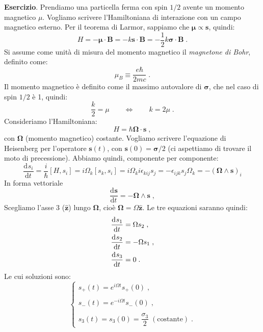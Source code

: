 \documentclass[12pt,a4paper]{report}
\theoremstyle{definition}
\newcommand{\dev}[3][]{\frac{\mathrm{d}^{#1} #2}{\mathrm{d} #3^{#1}}}
\numberwithin{equation}{section}
\begin{document}
\textbf{Esercizio}. Prendiamo una particella ferma con spin $1/2$ avente un momento magnetico $\mu$. Vogliamo scrivere l'Hamiltoniana di interazione con un campo magnetico esterno. Per il teorema di Larmor, sappiamo che $\boldsymbol{\mu}\propto \mathbf{s}$, quindi:
\begin{equation}
H=-\boldsymbol{\mu}\cdot\mathbf{B}=-k\mathbf{s}\cdot\mathbf{B}=-\frac{1}{2}k\boldsymbol{\sigma}\cdot\mathbf{B}\;.
\end{equation}
Si assume come unità di misura del momento magnetico il \textit{magnetone di Bohr}, definito come:
\begin{equation}
\mu_B\equiv \frac{e\hbar}{2mc}\;.
\end{equation}
Il momento magnetico è definito come il massimo autovalore di $\boldsymbol{\sigma}$, che nel caso di spin $1/2$ è 1, quindi:
\begin{equation}
\frac{k}{2}=\mu \qquad \Longleftrightarrow \qquad k=2\mu\;.
\end{equation}
Consideriamo l'Hamiltoniana:
\begin{equation}
H=\hbar \boldsymbol{\Omega}\cdot \mathbf{s}\;,
\end{equation}
con $\boldsymbol{\Omega}$ (momento magnetico) costante. Vogliamo scrivere l'equazione di Heisenberg per l'operatore $\mathbf{s}(t)$, con $\mathbf{s}(0)=\boldsymbol{\sigma}/2$ (ci aspettiamo di trovare il moto di precessione). Abbiamo quindi, componente per componente:
\begin{equation}
\dev{s_i}{t}=\frac{i}{\hbar}[H,s_i]=i\Omega_k[s_k,s_i]=i\Omega_k i\epsilon_{kij}s_j=-\epsilon_{ijk}s_j\Omega_k=-(\boldsymbol{\Omega}\wedge\mathbf{s})_i
\end{equation}
In forma vettoriale
\begin{equation}
\dev{\mathbf{s}}{t}=-\boldsymbol{\Omega}\wedge\mathbf{s}\;,
\end{equation}
Scegliamo l'asse 3 ($\hat{\mathbf{z}}$) lungo $\boldsymbol{\Omega}$, cioè $\boldsymbol{\Omega}=\Omega\hat{\mathbf{z}}$. Le tre equazioni saranno quindi:
\begin{align}
\dev{s_1}{t} &= \Omega s_2\;, \notag \\
\dev{s_2}{t} &= -\Omega s_1\;, \notag \\
\dev{s_3}{t} &= 0\;.
\end{align}
Le cui soluzioni sono:
\begin{equation}
\begin{cases}
s_+(t)=e^{i\Omega t}s_+(0)\;, \\
\\
s_-(t)=e^{-i\Omega t}s_-(0)\;, \\
\\
s_3(t)=s_3(0)=\dfrac{\sigma_3}{2}\; (\mbox{costante})\;.
\end{cases}
\end{equation}
\end{document}
